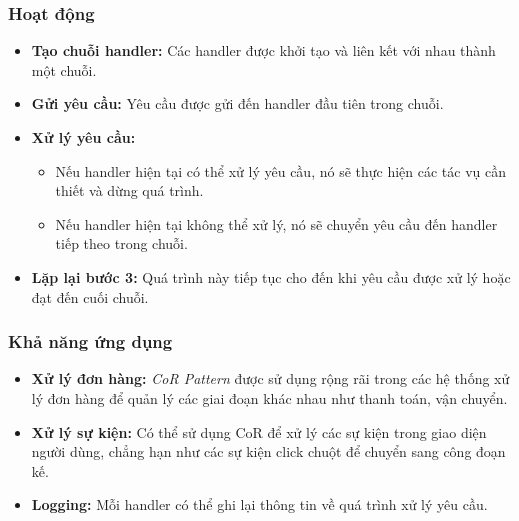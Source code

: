 \subsubsection{Hoạt động}
\begin{flushleft}
	\begin{itemize}
		\item \textbf{Tạo chuỗi handler:} Các handler được khởi tạo và liên kết với nhau thành một chuỗi.
		\item \textbf{Gửi yêu cầu:} Yêu cầu được gửi đến handler đầu tiên trong chuỗi.
		\item \textbf{Xử lý yêu cầu:}
		      \begin{itemize}
			      \item Nếu handler hiện tại có thể xử lý yêu cầu, nó sẽ thực hiện các tác vụ cần thiết và dừng quá trình.
			      \item Nếu handler hiện tại không thể xử lý, nó sẽ chuyển yêu cầu đến handler tiếp theo trong chuỗi.
		      \end{itemize}
		\item \textbf{Lặp lại bước 3:} Quá trình này tiếp tục cho đến khi yêu cầu được xử lý hoặc đạt đến cuối chuỗi.
	\end{itemize}
\end{flushleft}

\subsubsection{Khả năng ứng dụng}
\begin{flushleft}
	\begin{itemize}
		\item \textbf{Xử lý đơn hàng:} \textit{CoR Pattern} được sử dụng rộng rãi trong các hệ thống xử lý đơn hàng để quản lý các giai đoạn khác nhau như thanh toán, vận chuyển.
		\item \textbf{Xử lý sự kiện:} Có thể sử dụng CoR để xử lý các sự kiện trong giao diện người dùng, chẳng hạn như các sự kiện click chuột để chuyển sang công đoạn kế.
		\item \textbf{Logging:} Mỗi handler có thể ghi lại thông tin về quá trình xử lý yêu cầu.
	\end{itemize}
\end{flushleft}

